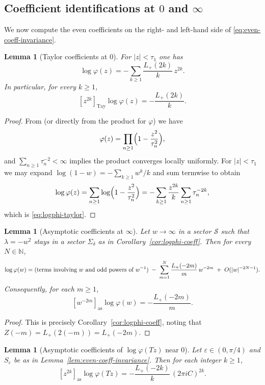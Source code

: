 \documentclass[11pt,letterpaper]{amsart}
\numberwithin{equation}{section}
\newtheorem{lemma}[theorem]{Lemma}
\theoremstyle{definition}
\newcommand{\N}{\mathbb{N}}
\begin{document}
\subsection{Coefficient identifications at $0$ and $\infty$}

We now compute the even coefficients on the right- and left-hand side of
\eqref{eq:even-coeff-invariance}.

\begin{lemma}[Taylor coefficients at $0$]\label{lem:tay-at-zero}
For $|z|<\tau_1$ one has
\begin{equation}\label{eq:logphi-taylor}
\log\varphi(z)=-\sum_{k\ge1}\frac{L_+(2k)}{k}\,z^{2k}.
\end{equation}
In particular, for every $k\ge1$,
\[
[z^{2k}]_{\mathrm{Tay}}\log\varphi(z)=-\frac{L_+(2k)}{k}.
\]
\end{lemma}

\begin{proof}
From \cite[(1.1) and (1.5)]{BOCRS} (or directly from the product for $\varphi$) we have
\[
\varphi(z)=\prod_{n\ge1}\Bigl(1-\frac{z^2}{\tau_n^2}\Bigr),
\]
and $\sum_{n\ge1}\tau_n^{-2}<\infty$ implies the product converges locally uniformly.
For $|z|<\tau_1$ we may expand $\log(1-w)=-\sum_{k\ge1} w^k/k$ and sum termwise to obtain
\[
\log\varphi(z)=\sum_{n\ge1}\log\Bigl(1-\frac{z^2}{\tau_n^2}\Bigr)
=-\sum_{k\ge1}\frac{z^{2k}}{k}\sum_{n\ge1}\tau_n^{-2k},
\]
which is \eqref{eq:logphi-taylor}.
\end{proof}

\begin{lemma}[Asymptotic coefficients at $\infty$]\label{lem:as-at-infty}
Let $w\to\infty$ in a sector $\mathcal{S}$ such that $\lambda=-w^2$ stays in a sector $\Sigma_\delta$
as in Corollary~\ref{cor:logphi-coeff}. Then for every $N\in\N$,
\begin{equation}\label{eq:logphi-infty}
\log\varphi(w)=\textup{(terms involving $w$ and odd powers of $w^{-1}$)}\;-\;\sum_{m=1}^{N}\frac{L_+(-2m)}{m}\,w^{-2m}
\;+\;O(|w|^{-2N-1}).
\end{equation}
Consequently, for each $m\ge1$,
\[
[w^{-2m}]_{\mathrm{as}}\log\varphi(w)=-\frac{L_+(-2m)}{m}.
\]
\end{lemma}

\begin{proof}
This is precisely Corollary~\ref{cor:logphi-coeff}, noting that $Z(-m)=L_+(2(-m))=L_+(-2m)$.
\end{proof}

\begin{lemma}[Asymptotic coefficients of $\log\varphi(Tz)$ near $0$]\label{lem:as-Tz}
Let $\varepsilon\in(0,\pi/4)$ and $S_\varepsilon$ be as in Lemma~\ref{lem:even-coeff-invariance}.
Then for each integer $k\ge1$,
\begin{equation}\label{eq:coeff-logphiT}
[z^{2k}]_{\mathrm{as}}\log\varphi(Tz)=-\frac{L_+(-2k)}{k}\,(2\pi i C)^{2k}.
\end{equation}
\end{lemma}
\end{document}
